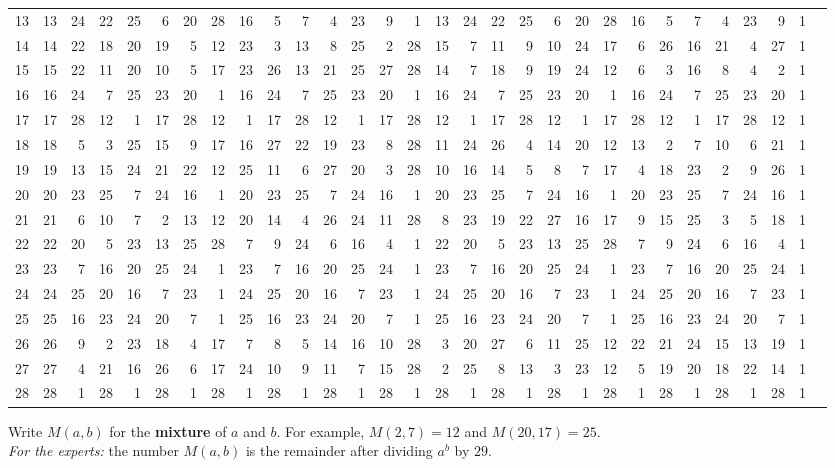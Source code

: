 \documentclass[12pt]{article}
\begin{document}
\begin{center}
\begin{tabular}{c||rrrrr|rrrrr|rrrrr|rrrrr|rrrrr|rrrr}
13 & 13 & 24 & 22 & 25 & 6 & 20 & 28 & 16 & 5 & 7 & 4 & 23 & 9 & 1 & 13 & 24 & 22 & 25 & 6 & 20 & 28 & 16 & 5 & 7 & 4 & 23 & 9 & 1 \\
14 & 14 & 22 & 18 & 20 & 19 & 5 & 12 & 23 & 3 & 13 & 8 & 25 & 2 & 28 & 15 & 7 & 11 & 9 & 10 & 24 & 17 & 6 & 26 & 16 & 21 & 4 & 27 & 1 \\
15 & 15 & 22 & 11 & 20 & 10 & 5 & 17 & 23 & 26 & 13 & 21 & 25 & 27 & 28 & 14 & 7 & 18 & 9 & 19 & 24 & 12 & 6 & 3 & 16 & 8 & 4 & 2 & 1 \\
\hline
16 & 16 & 24 & 7 & 25 & 23 & 20 & 1 & 16 & 24 & 7 & 25 & 23 & 20 & 1 & 16 & 24 & 7 & 25 & 23 & 20 & 1 & 16 & 24 & 7 & 25 & 23 & 20 & 1 \\
17 & 17 & 28 & 12 & 1 & 17 & 28 & 12 & 1 & 17 & 28 & 12 & 1 & 17 & 28 & 12 & 1 & 17 & 28 & 12 & 1 & 17 & 28 & 12 & 1 & 17 & 28 & 12 & 1 \\
18 & 18 & 5 & 3 & 25 & 15 & 9 & 17 & 16 & 27 & 22 & 19 & 23 & 8 & 28 & 11 & 24 & 26 & 4 & 14 & 20 & 12 & 13 & 2 & 7 & 10 & 6 & 21 & 1 \\
19 & 19 & 13 & 15 & 24 & 21 & 22 & 12 & 25 & 11 & 6 & 27 & 20 & 3 & 28 & 10 & 16 & 14 & 5 & 8 & 7 & 17 & 4 & 18 & 23 & 2 & 9 & 26 & 1 \\
20 & 20 & 23 & 25 & 7 & 24 & 16 & 1 & 20 & 23 & 25 & 7 & 24 & 16 & 1 & 20 & 23 & 25 & 7 & 24 & 16 & 1 & 20 & 23 & 25 & 7 & 24 & 16 & 1 \\
\hline
21 & 21 & 6 & 10 & 7 & 2 & 13 & 12 & 20 & 14 & 4 & 26 & 24 & 11 & 28 & 8 & 23 & 19 & 22 & 27 & 16 & 17 & 9 & 15 & 25 & 3 & 5 & 18 & 1 \\
22 & 22 & 20 & 5 & 23 & 13 & 25 & 28 & 7 & 9 & 24 & 6 & 16 & 4 & 1 & 22 & 20 & 5 & 23 & 13 & 25 & 28 & 7 & 9 & 24 & 6 & 16 & 4 & 1 \\
23 & 23 & 7 & 16 & 20 & 25 & 24 & 1 & 23 & 7 & 16 & 20 & 25 & 24 & 1 & 23 & 7 & 16 & 20 & 25 & 24 & 1 & 23 & 7 & 16 & 20 & 25 & 24 & 1 \\
24 & 24 & 25 & 20 & 16 & 7 & 23 & 1 & 24 & 25 & 20 & 16 & 7 & 23 & 1 & 24 & 25 & 20 & 16 & 7 & 23 & 1 & 24 & 25 & 20 & 16 & 7 & 23 & 1 \\
25 & 25 & 16 & 23 & 24 & 20 & 7 & 1 & 25 & 16 & 23 & 24 & 20 & 7 & 1 & 25 & 16 & 23 & 24 & 20 & 7 & 1 & 25 & 16 & 23 & 24 & 20 & 7 & 1 \\
\hline
26 & 26 & 9 & 2 & 23 & 18 & 4 & 17 & 7 & 8 & 5 & 14 & 16 & 10 & 28 & 3 & 20 & 27 & 6 & 11 & 25 & 12 & 22 & 21 & 24 & 15 & 13 & 19 & 1 \\
27 & 27 & 4 & 21 & 16 & 26 & 6 & 17 & 24 & 10 & 9 & 11 & 7 & 15 & 28 & 2 & 25 & 8 & 13 & 3 & 23 & 12 & 5 & 19 & 20 & 18 & 22 & 14 & 1 \\
28 & 28 & 1 & 28 & 1 & 28 & 1 & 28 & 1 & 28 & 1 & 28 & 1 & 28 & 1 & 28 & 1 & 28 & 1 & 28 & 1 & 28 & 1 & 28 & 1 & 28 & 1 & 28 & 1 \\
\end{tabular}
\end{center}

Write $M(a,b)$ for the \textbf{mixture} of $a$ and $b$.  For example, $M(2,7) = 12$ and $M(20,17) = 25$. \\[1ex]

\textit{For the experts:} the number $M(a,b)$ is the remainder after dividing $a^b$ by $29$.
\end{document}

